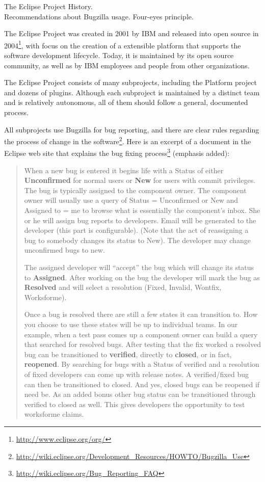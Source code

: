   \begin{subsection}{The Eclipse Project}
History. \\
Recommendations about Bugzilla usage. Four-eyes principle.

The Eclipse Project was created in 2001 by IBM and released into open source in 2004\footnote{\url{http://www.eclipse.org/org/}}, with focus on the creation of a extensible platform that supports the software development lifecycle. Today, it is maintained by its open source community, as well as by IBM employees and people from other organizations.

The Eclipse Project consists of many subprojects, including the Platform project and dozens of plugins. Although each subproject is maintained by a distinct team and is relatively autonomous, all of them should follow a general, documented process. 

All subprojects use Bugzilla for bug reporting, and there are clear rules regarding the process of change in the software\footnote{\url{http://wiki.eclipse.org/Development_Resources/HOWTO/Bugzilla_Use}}. Here is an excerpt of a document in the Eclipse web site that explains the bug fixing process\footnote{\url{http://wiki.eclipse.org/Bug_Reporting_FAQ}} (emphasis added):

\begin{quote}
When a new bug is entered it begins life with a Status of either \textbf{Unconfirmed} for normal users or \textbf{New} for users with commit privileges. The bug is typically assigned to the component owner. The component owner will usually use a query of Status = Unconfirmed or New and Assigned to = me to browse what is essentially the component's inbox. She or he will assign bug reports to developers. Email will be generated to the developer (this part is configurable). (Note that the act of reassigning a bug to somebody changes its status to New). The developer may change unconfirmed bugs to new.

The assigned developer will “accept” the bug which will change its status to \textbf{Assigned}. After working on the bug the developer will mark the bug as \textbf{Resolved} and will select a resolution (Fixed, Invalid, Wontfix, Worksforme).

Once a bug is resolved there are still a few states it can transition to. How you choose to use these states will be up to individual teams. In our example, when a test pass comes up a component owner can build a query that searched for resolved bugs. After testing that the fix worked a resolved bug can be transitioned to \textbf{verified}, directly to \textbf{closed}, or in fact, \textbf{reopened}. By searching for bugs with a Status of verified and a resolution of fixed developers can come up with release notes. A verified/fixed bug can then be transitioned to closed. And yes, closed bugs can be reopened if need be. As an added bonus other bug status can be transitioned through verified to closed as well. This gives developers the opportunity to test worksforme claims.
\end{quote}


\end{subsection}
